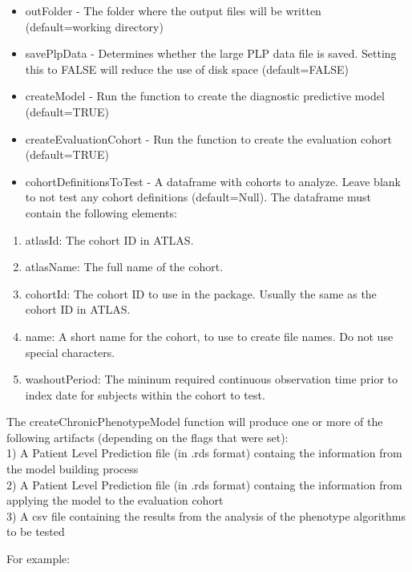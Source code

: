 \documentclass[
]{article}
\providecommand{\tightlist}{%
  \setlength{\itemsep}{0pt}\setlength{\parskip}{0pt}}
\begin{document}
\begin{itemize}
\item
  outFolder - The folder where the output files will be written
  (default=working directory)
\item
  savePlpData - Determines whether the large PLP data file is saved.
  Setting this to FALSE will reduce the use of disk space
  (default=FALSE)
\item
  createModel - Run the function to create the diagnostic predictive
  model (default=TRUE)
\item
  createEvaluationCohort - Run the function to create the evaluation
  cohort (default=TRUE)
\item
  cohortDefinitionsToTest - A dataframe with cohorts to analyze. Leave
  blank to not test any cohort definitions (default=Null). The dataframe
  must contain the following elements:
\end{itemize}

\begin{enumerate}
\def\labelenumi{\arabic{enumi})}
\tightlist
\item
  atlasId: The cohort ID in ATLAS.
\item
  atlasName: The full name of the cohort.
\item
  cohortId: The cohort ID to use in the package. Usually the same as the
  cohort ID in ATLAS.
\item
  name: A short name for the cohort, to use to create file names. Do not
  use special characters.
\item
  washoutPeriod: The mininum required continuous observation time prior
  to index date for subjects within the cohort to test.
\end{enumerate}

The createChronicPhenotypeModel function will produce one or more of the
following artifacts (depending on the flags that were set):\\
1) A Patient Level Prediction file (in .rds format) containg the
information from the model building process\\
2) A Patient Level Prediction file (in .rds format) containg the
information from applying the model to the evaluation cohort\\
3) A csv file containing the results from the analysis of the phenotype
algorithms to be tested

For example:
\end{document}
